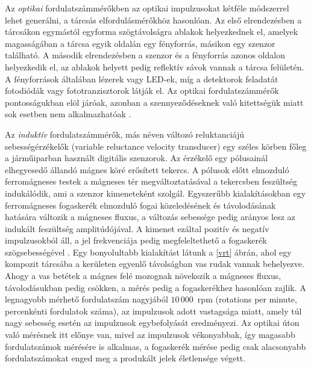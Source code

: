 Az \textit{optikai} fordulatszámmérőkben az optikai impulzusokat kétféle módszerrel lehet generálni, a tárcsás elfordulásmérőkhöz hasonlóan. Az első elrendezésben a tárcsákon egymástól egyforma szögtávolságra ablakok helyezkednek el, amelyek magasságában a tárcsa egyik oldalán egy fényforrás, másikon egy szenzor található. A második elrendezésben a szenzor és a fényforrás azonos oldalon helyezkedik el, az ablakok helyett pedig reflektív sávok vannak a tárcsa felületén. A fényforrások általában lézerek vagy LED-ek, míg a detektorok feladatát fotodiódák vagy fototranzisztorok látják el. Az optikai fordulatszámmérők pontosságukban elöl járóak, azonban a szennyeződéseknek való kitettségük miatt sok esetben nem alkalmazhatóak \cite{Morris2016b}.

Az \textit{induktív} fordulatszámmérők, más néven változó reluktanciájú sebességérzékelők (variable reluctance velocity transducer) egy széles körben főleg a járműiparban használt digitális szenzorok. Az érzékelő egy pólusainál elhegyesedő állandó mágnes köré erősített tekercs. A pólusok előtt elmozduló ferromágneses testek a mágneses tér megváltoztatásával a tekercsben feszültség indukálódik, ami a szenzor kimeneteként szolgál. Egyszerűbb kialakításokban egy ferromágneses fogaskerék elmozduló fogai közeledésének és távolodásának hatására változik a mágneses fluxus, a változás sebessége pedig arányos lesz az indukált feszültség amplitúdójával. A kimenet ezáltal pozitív és negatív impulzusokból áll, a jel frekvenciája pedig megfeleltethető a fogaskerék szögsebességével \cite{Morris2016}. Egy bonyolultabb kialakítást látunk a \ref{vrt} ábrán, ahol egy kompozit tárcsába a kerületen egyenlő távolságban vas rudak vannak behelyezve. Ahogy a vas betétek a mágnes felé mozognak növekszik a mágneses fluxus, távolodásukban pedig csökken, a mérés pedig a fogaskerékhez hasonlóan zajlik. A legnagyobb mérhető fordulatszám nagyjából $10\,000$~rpm (rotations per minute, percenkénti fordulatok száma), az impulzusok adott vastagsága miatt, amely túl nagy sebesség esetén az impulzusok egybefolyását eredményezi. Az optikai úton való mérésnek itt előnye van, mivel az impulzusok vékonyabbak, így magasabb fordulatszámok mérésére is alkalmas, a fogaskerék mérése pedig csak alacsonyabb fordulatszámokat enged meg a produkált jelek életlensége végett.
